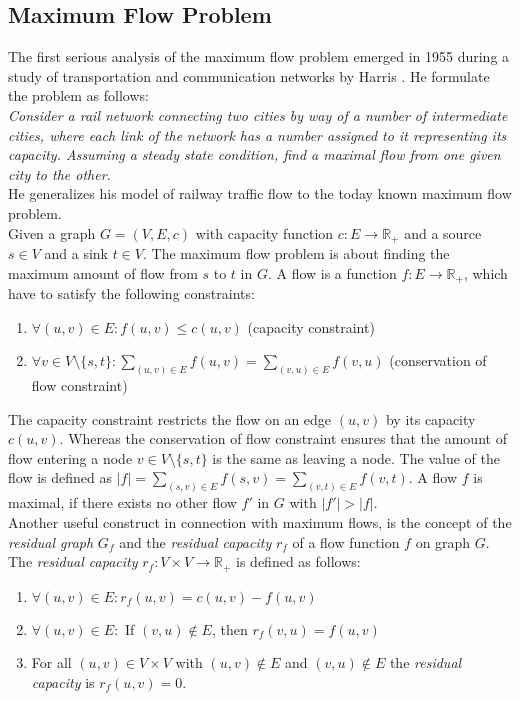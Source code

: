 
\subsection{Maximum Flow Problem}
\label{sec:max_flow}

The first serious analysis of the maximum flow problem emerged in 1955 during 
a study of transportation and communication networks by Harris \cite{harris1955}. 
He formulate the problem as follows: \\
\emph{Consider a rail network connecting two cities by way of a number of
intermediate cities, where each link of the network has a number assigned to
it representing its capacity. Assuming a steady state condition, find a maximal
flow from one given city to the other.} \\
He generalizes his model of railway traffic flow to the today known maximum 
flow problem. \\
Given a graph $G = (V,E,c)$ with capacity function $c: E \rightarrow \mathbb{R}_+$ and a source 
$s \in V$ and a sink $t \in V$. The maximum flow problem is about finding 
the maximum amount of flow from $s$ to $t$ in $G$. A flow is a function 
$f: E \rightarrow \mathbb{R}_+$, which have to satisfy the following constraints:
\begin{enumerate}
\item $\forall (u,v) \in E: f(u,v) \le c(u,v)$ (capacity constraint)
\item $\forall v \in V \setminus \{s,t\}: \sum_{(u,v) \in E} f(u,v) = \sum_{(v,u) \in E} f(v,u)$ (conservation of flow constraint)
\end{enumerate}
The capacity constraint restricts the flow on an edge $(u,v)$ by its capacity 
$c(u,v)$. Whereas the conservation of flow constraint ensures that the amount
of flow entering a node $v \in V \setminus \{s,t\}$ is the same as leaving a node.
The value of the flow is defined as $|f| = \sum_{(s,v) \in E} f(s,v) = \sum_{(v,t) \in E} f(v,t)$.
A flow $f$ is maximal, if there exists no other flow $f'$ in $G$ with $|f'| > |f|$. \\
Another useful construct in connection with maximum flows, is the concept of the
\emph{residual graph} $G_f$ and the \emph{residual capacity} $r_f$ of a flow function $f$ on graph $G$.
The \emph{residual capacity} $r_f: V \times V \rightarrow \mathbb{R}_+$ is defined as follows:
\begin{enumerate}
\item $\forall (u,v) \in E: r_f(u,v) = c(u,v) - f(u,v)$
\item $\forall (u,v) \in E:$ If $(v,u) \notin E$, then $r_f(v,u) = f(u,v)$
\item For all $(u,v) \in V \times V$ with $(u,v) \notin E$ and $(v,u) \notin E$ the
      \emph{residual capacity} is $r_f(u,v) = 0$. 
\end{enumerate}
